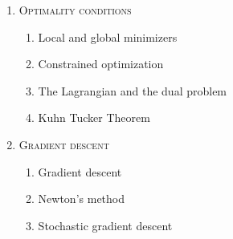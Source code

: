 \begin{enumerate}[label=\textbf{\arabic*.}]
\item \textsc{Optimality conditions}
\vspace{-0.2cm}
\begin{enumerate}[label=\arabic*.,noitemsep]
\item Local and global minimizers
\item Constrained optimization
\item The Lagrangian and the dual problem
\item Kuhn Tucker Theorem
\end{enumerate}
\item \textsc{Gradient descent}
\vspace{-0.2cm}
\begin{enumerate}[label=\arabic*.,noitemsep]
\item Gradient descent
\item Newton's method
\item Stochastic gradient descent
\end{enumerate}
\end{enumerate}
